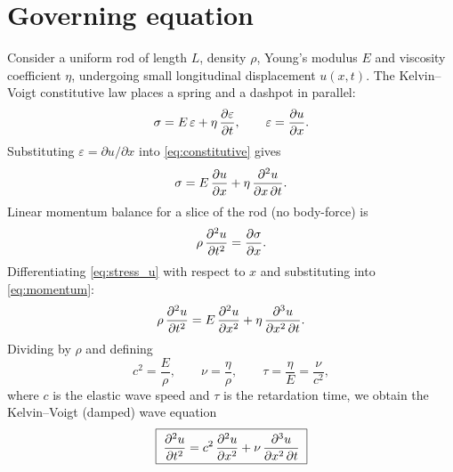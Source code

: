 \section{Governing equation}

Consider a uniform rod of length $L$, density $\rho$, Young's modulus $E$
and viscosity coefficient $\eta$, undergoing small longitudinal displacement
$u(x,t)$. The Kelvin--Voigt constitutive law places a spring and a dashpot
in parallel:
\begin{equation}
  \sigma = E\,\varepsilon + \eta\,\frac{\partial \varepsilon}{\partial t},
  \qquad
  \varepsilon = \frac{\partial u}{\partial x}.
  \label{eq:constitutive}
\end{equation}
Substituting $\varepsilon = \partial u/\partial x$ into \cref{eq:constitutive} gives
\begin{equation}
  \sigma = E\,\frac{\partial u}{\partial x} + \eta\,\frac{\partial^2 u}{\partial x\,\partial t}.
  \label{eq:stress_u}
\end{equation}
Linear momentum balance for a slice of the rod (no body-force) is
\begin{equation}
  \rho\,\frac{\partial^2 u}{\partial t^2} = \frac{\partial \sigma}{\partial x}.
  \label{eq:momentum}
\end{equation}
Differentiating \cref{eq:stress_u} with respect to $x$ and substituting into
\cref{eq:momentum}:
\begin{equation}
  \rho\,\frac{\partial^2 u}{\partial t^2} = E\,\frac{\partial^2 u}{\partial x^2} + \eta\,\frac{\partial^3 u}{\partial x^2\,\partial t}.
\end{equation}
Dividing by $\rho$ and defining
\begin{equation}
  c^2 = \frac{E}{\rho}, \qquad
  \nu = \frac{\eta}{\rho}, \qquad
  \tau = \frac{\eta}{E} = \frac{\nu}{c^2},
  \label{eq:params}
\end{equation}
where $c$ is the elastic wave speed and $\tau$ is the retardation time, we
obtain the Kelvin--Voigt (damped) wave equation
\begin{equation}
  \boxed{\;\frac{\partial^2 u}{\partial t^2} = c^2\,\frac{\partial^2 u}{\partial x^2} + \nu\,\frac{\partial^3 u}{\partial x^2\,\partial t}\;}
  \label{eq:pde}
\end{equation}
